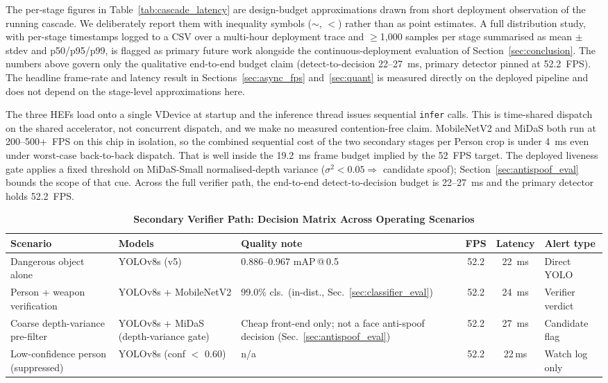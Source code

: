 \documentclass{ieeeaccess}
\begin{document}
The per-stage figures in Table~\ref{tab:cascade_latency} are design-budget approximations drawn from short deployment observation of the running cascade. We deliberately report them with inequality symbols ($\sim$, $<$) rather than as point estimates. A full distribution study, with per-stage timestamps logged to a CSV over a multi-hour deployment trace and $\geq$1{,}000 samples per stage summarised as mean $\pm$ stdev and p50/p95/p99, is flagged as primary future work alongside the continuous-deployment evaluation of Section~\ref{sec:conclusion}. The numbers above govern only the qualitative end-to-end budget claim (detect-to-decision 22--27~ms, primary detector pinned at 52.2~FPS). The headline frame-rate and latency result in Sections~\ref{sec:async_fps} and~\ref{sec:quant} is measured directly on the deployed pipeline and does not depend on the stage-level approximations here.

The three HEFs load onto a single VDevice at startup and the inference thread issues sequential \texttt{infer} calls. This is time-shared dispatch on the shared accelerator, not concurrent dispatch, and we make no measured contention-free claim. MobileNetV2 and MiDaS both run at 200--500+~FPS on this chip in isolation, so the combined sequential cost of the two secondary stages per Person crop is under 4~ms even under worst-case back-to-back dispatch. That is well inside the 19.2~ms frame budget implied by the 52~FPS target. The deployed liveness gate applies a fixed threshold on MiDaS-Small normalised-depth variance ($\sigma^2 < 0.05 \Rightarrow$ candidate spoof); Section~\ref{sec:antispoof_eval} bounds the scope of that cue. Across the full verifier path, the end-to-end detect-to-decision budget is 22--27~ms and the primary detector holds 52.2~FPS.

\begin{table}[!t]
\caption{\textbf{Secondary Verifier Path: Decision Matrix Across Operating Scenarios}}
\label{tab:cascade_matrix}
\centering
\small
\begin{tabular}{|p{4.4cm}|p{3.2cm}|p{3cm}|c|c|p{2.5cm}|}
\hline
\textbf{Scenario} & \textbf{Models} & \textbf{Quality note} & \textbf{FPS} & \textbf{Latency} & \textbf{Alert type} \\
\hline
Dangerous object alone & YOLOv8s (v5) & 0.886--0.967 mAP\,@\,0.5 & 52.2 & 22~ms & Direct YOLO \\
Person + weapon verification & YOLOv8s + MobileNetV2 & 99.0\% cls.\ (in-dist., Sec.~\ref{sec:classifier_eval}) & 52.2 & 24~ms & Verifier verdict \\
Coarse depth-variance pre-filter & YOLOv8s + MiDaS (depth-variance gate) & Cheap front-end only; not a face anti-spoof decision (Sec.~\ref{sec:antispoof_eval}) & 52.2 & 27~ms & Candidate flag \\
Low-confidence person (suppressed) & YOLOv8s (conf $<$ 0.60) & n/a & 52.2 & 22\,ms & Watch log only \\
\hline
\end{tabular}
\end{table}
\end{document}
